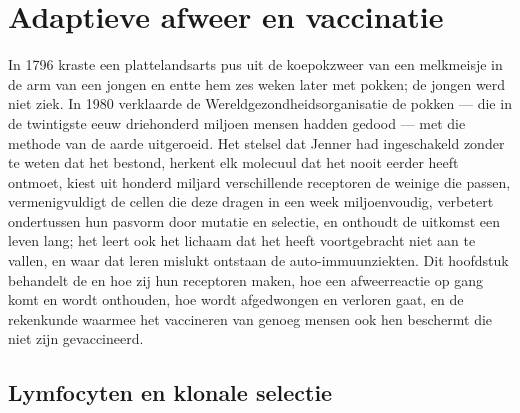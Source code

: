 \chapter{Adaptieve afweer en vaccinatie}\label{ch:b3:adaptive-immunity}

In 1796 kraste een plattelandsarts pus uit de koepokzweer van een
melkmeisje in de arm van een jongen en entte hem zes weken later met
pokken; de jongen werd niet ziek. In 1980 verklaarde de
Wereldgezondheidsorganisatie de pokken --- die in de twintigste eeuw
driehonderd miljoen mensen hadden gedood --- met die methode van de
aarde uitgeroeid. Het stelsel dat Jenner had ingeschakeld zonder te
weten dat het bestond, herkent elk molecuul dat het nooit eerder heeft
ontmoet, kiest uit honderd miljard verschillende receptoren de weinige
die passen, vermenigvuldigt de cellen die deze dragen in een week
miljoenvoudig, verbetert ondertussen hun pasvorm door mutatie en
selectie, en onthoudt de uitkomst een leven lang; het leert ook het
lichaam dat het heeft voortgebracht niet aan te vallen, en waar dat
leren mislukt ontstaan de auto-immuunziekten. Dit hoofdstuk behandelt
de  en hoe zij hun receptoren maken, hoe een afweerreactie op
gang komt en wordt onthouden, hoe  wordt afgedwongen en
verloren gaat, en de rekenkunde waarmee het vaccineren van genoeg
mensen ook hen beschermt die niet zijn gevaccineerd.

\section{Lymfocyten en klonale selectie}

